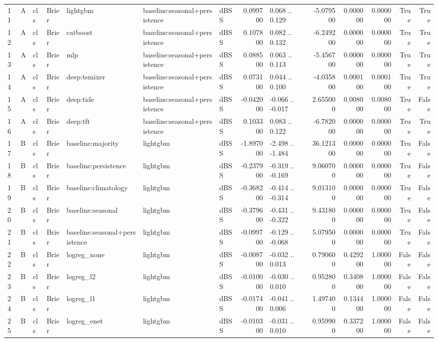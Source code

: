 \begin{table}
\begin{tabular}{lllllllrlrrrrr}
11 & A & cls & Brier & lightgbm & baseline:seasonal+persistence & dBSS & 0.099700 & 0.068 .. 0.129 & -5.079500 & 0.000000 & 0.000000 & True & True \\
12 & A & cls & Brier & catboost & baseline:seasonal+persistence & dBSS & 0.107800 & 0.082 .. 0.132 & -6.249200 & 0.000000 & 0.000000 & True & True \\
13 & A & cls & Brier & mlp & baseline:seasonal+persistence & dBSS & 0.088500 & 0.063 .. 0.113 & -5.456700 & 0.000000 & 0.000000 & True & True \\
14 & A & cls & Brier & deep:tsmixer & baseline:seasonal+persistence & dBSS & 0.073100 & 0.044 .. 0.100 & -4.035800 & 0.000100 & 0.000100 & True & True \\
15 & A & cls & Brier & deep:tide & baseline:seasonal+persistence & dBSS & -0.042000 & -0.066 .. -0.017 & 2.655000 & 0.008000 & 0.008000 & True & False \\
16 & A & cls & Brier & deep:tft & baseline:seasonal+persistence & dBSS & 0.103300 & 0.083 .. 0.122 & -6.782000 & 0.000000 & 0.000000 & True & True \\
17 & B & cls & Brier & baseline:majority & lightgbm & dBSS & -1.897000 & -2.498 .. -1.484 & 36.121300 & 0.000000 & 0.000000 & True & False \\
18 & B & cls & Brier & baseline:persistence & lightgbm & dBSS & -0.237900 & -0.319 .. -0.169 & 9.060700 & 0.000000 & 0.000000 & True & False \\
19 & B & cls & Brier & baseline:climatology & lightgbm & dBSS & -0.368200 & -0.414 .. -0.314 & 9.013100 & 0.000000 & 0.000000 & True & False \\
20 & B & cls & Brier & baseline:seasonal & lightgbm & dBSS & -0.379600 & -0.431 .. -0.322 & 9.431800 & 0.000000 & 0.000000 & True & False \\
21 & B & cls & Brier & baseline:seasonal+persistence & lightgbm & dBSS & -0.099700 & -0.129 .. -0.068 & 5.079500 & 0.000000 & 0.000000 & True & False \\
22 & B & cls & Brier & logreg\_none & lightgbm & dBSS & -0.008700 & -0.032 .. 0.013 & 0.790600 & 0.429200 & 1.000000 & False & False \\
23 & B & cls & Brier & logreg\_l2 & lightgbm & dBSS & -0.010000 & -0.030 .. 0.010 & 0.952800 & 0.340800 & 1.000000 & False & False \\
24 & B & cls & Brier & logreg\_l1 & lightgbm & dBSS & -0.017400 & -0.041 .. 0.006 & 1.497400 & 0.134400 & 1.000000 & False & False \\
25 & B & cls & Brier & logreg\_enet & lightgbm & dBSS & -0.010300 & -0.031 .. 0.010 & 0.959900 & 0.337200 & 1.000000 & False & False \\

\end{tabular}
\end{table}
